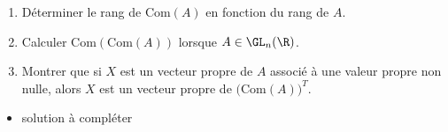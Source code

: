 \begin{enonce}
\begin{exercise}[ID={RMS134 E559},subtitle={Oral
    Mines-Ponts},theme={algebre},annee={2023},concours={mines-ponts},filiere={MP}]
  \begin{enumerate}
  \item Déterminer le rang de $\mathrm{Com}(A)$ en fonction du rang de
    $A$.
  \item Calculer $\mathrm{Com}(\mathrm{Com}(A))$ lorsque
    $A\in\GL_n(\R)$.
  \item Montrer que si $X$ est un vecteur propre de $A$ associé à une
    valeur propre non nulle, alors $X$ est un vecteur propre de
    $\big(\mathrm{Com}(A)\big)^T$.
  \end{enumerate}
\end{exercise}
\begin{solution}
  \begin{itemize}
  \item solution à compléter
  \end{itemize}
\end{solution}
\end{enonce}